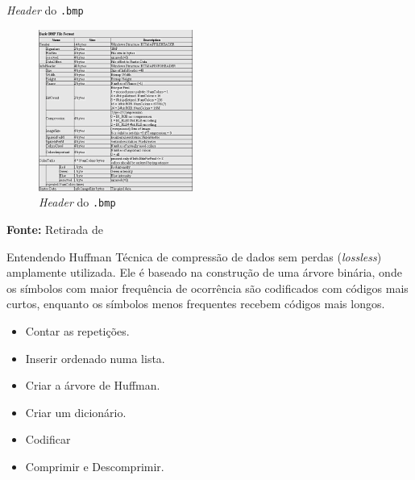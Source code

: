 \documentclass{beamer}
\begin{document}
    \begin{frame}{\textit{Header} do \texttt{.bmp}}
        \begin{figure}
            \centering
            \caption{\textit{Header} do \texttt{.bmp}} %
            \includegraphics[width=0.45\textwidth]{imagens/bmp_header.png}
        \end{figure}
        \vspace{2mm} %
        \centering
        \textbf{Fonte:} Retirada de \textcolor{blue}{\cite{bmpfileformat}}%
    \end{frame}

    \begin{frame}{Entendendo Huffman}
        Técnica de compressão de dados sem perdas (\textit{lossless}) amplamente utilizada. Ele é baseado na construção de uma árvore binária, onde os símbolos com maior frequência de ocorrência são codificados com códigos mais curtos, enquanto os símbolos menos frequentes recebem códigos mais longos. 
        \begin{itemize}
            \item Contar as repetições. 
            \item Inserir ordenado numa lista. 
            \item Criar a árvore de Huffman. 
            \item Criar um dicionário.
            \item Codificar
            \item Comprimir e Descomprimir.
        \end{itemize}
    \end{frame} 
\end{document}
